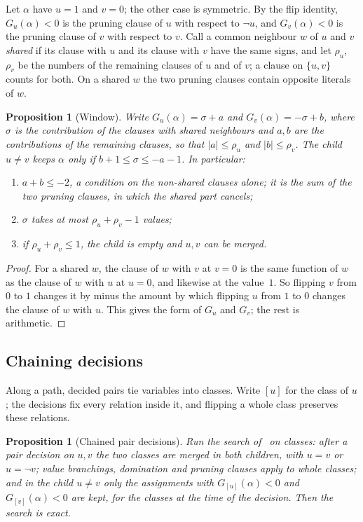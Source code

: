 \documentclass[11pt,a4paper]{article}
\newtheorem{proposition}[theorem]{Proposition}
\theoremstyle{remark}
\begin{document}
Let $\alpha$ have $u=1$ and $v=0$; the other case is symmetric. By the flip
identity, $G_u(\alpha)<0$ is the pruning clause of $u$ with respect to $\neg u$,
and $G_v(\alpha)<0$ is the pruning clause of $v$ with respect to $v$. Call a
common neighbour $w$ of $u$ and $v$ \emph{shared} if its clause with $u$ and
its clause with $v$ have the same signs, and let $\rho_u$, $\rho_v$ be the
numbers of the remaining clauses of $u$ and of $v$; a clause on $\{u,v\}$
counts for both. On a shared $w$ the two pruning clauses contain opposite
literals of $w$.

\begin{proposition}[Window]\label{prop:window}
Write $G_u(\alpha)=\sigma+a$ and $G_v(\alpha)=-\sigma+b$, where $\sigma$ is
the contribution of the clauses with shared neighbours and $a,b$ are the
contributions of the remaining clauses, so that $|a|\le\rho_u$ and
$|b|\le\rho_v$. The child $u\ne v$ keeps $\alpha$ only if
$b+1\le\sigma\le-a-1$. In particular:
\begin{enumerate}
 \item $a+b\le-2$, a condition on the non-shared clauses alone; it is the sum
 of the two pruning clauses, in which the shared part cancels;
 \item $\sigma$ takes at most $\rho_u+\rho_v-1$ values;
 \item if $\rho_u+\rho_v\le1$, the child is empty and $u,v$ can be merged.
\end{enumerate}
\end{proposition}

\begin{proof}
For a shared $w$, the clause of $w$ with $v$ at $v=0$ is the same function of
$w$ as the clause of $w$ with $u$ at $u=0$, and likewise at the value~$1$.
So flipping $v$ from $0$ to $1$ changes it by minus the amount by which
flipping $u$ from $1$ to $0$ changes the clause of $w$ with $u$. This gives the
form of $G_u$ and $G_v$; the rest is arithmetic.
\end{proof}

\subsection{Chaining decisions}

Along a path, decided pairs tie variables into classes. Write $[u]$ for the
class of $u$; the decisions fix every relation inside it, and flipping a whole
class preserves these relations.

\begin{proposition}[Chained pair decisions]\label{prop:chain}
Run the search of~\cite{N3} on classes: after a pair decision on $u,v$ the two
classes are merged in both children, with $u=v$ or $u=\neg v$; value
branchings, domination and pruning clauses apply to whole classes; and in the
child $u\ne v$ only the assignments with $G_{[u]}(\alpha)<0$ and
$G_{[v]}(\alpha)<0$ are kept, for the classes at the time of the decision.
Then the search is exact.
\end{proposition}
\end{document}
